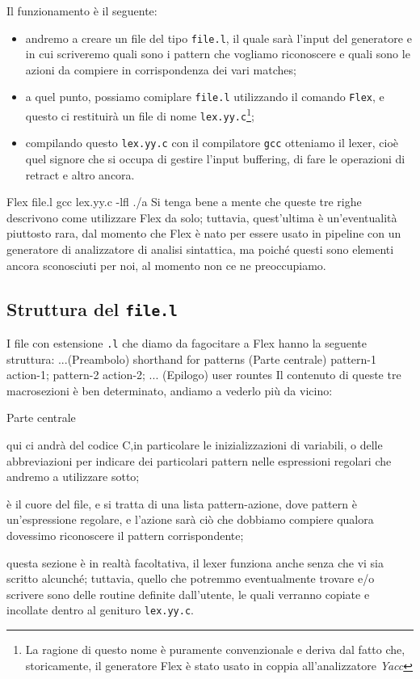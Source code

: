 \documentclass[class=book, crop=false, oneside, 12pt]{standalone}
\begin{document}
Il funzionamento è il seguente: 
\begin{itemize}
    \item andremo a creare un file del tipo \texttt{file.l}, il quale sarà l'input del generatore e in cui scriveremo quali sono i pattern che vogliamo riconoscere e quali sono le azioni da compiere in corrispondenza dei vari matches;
    \item a quel punto, possiamo comiplare \texttt{file.l} utilizzando il comando \texttt{Flex}, e questo ci restituirà un file di nome \texttt{lex.yy.c}\footnote{La ragione di questo nome è puramente convenzionale e deriva dal fatto che, storicamente, il generatore Flex è stato usato in coppia all'analizzatore \emph{Yacc}};
    \item compilando questo \texttt{lex.yy.c} con il compilatore \texttt{gcc} otteniamo il lexer, cioè quel signore che si occupa di gestire l'input buffering, di fare le operazioni di retract e altro ancora.
\end{itemize} 
Flex file.l
gcc lex.yy.c -lfl
./a
Si tenga bene a mente che queste tre righe descrivono come utilizzare Flex da solo; tuttavia, quest'ultima è un'eventualità piuttosto rara, dal momento che Flex è nato per essere usato in pipeline con un generatore di analizzatore di analisi sintattica, ma poiché questi sono elementi ancora sconosciuti per noi, al momento non ce ne preoccupiamo.

\subsection{Struttura del \texttt{file.l}}
I file con estensione \texttt{.l} che diamo da fagocitare a Flex hanno la seguente struttura:
...(Preambolo)
shorthand for patterns
(Parte centrale)
pattern-1 {action-1};
pattern-2 {action-2};
...
(Epilogo)
user rountes
Il contenuto di queste tre macrosezioni è ben determinato, andiamo a vederlo più da vicino:
\begin{labeling}{Parte centrale}
    \item[Preambolo] qui ci andrà del codice C,in particolare le inizializzazioni di variabili, o delle abbreviazioni per indicare dei particolari pattern nelle espressioni regolari che andremo a utilizzare sotto;
    \item[Parte centrale] è il cuore del file, e si tratta di una lista pattern-azione, dove pattern è un'espressione regolare, e l'azione sarà ciò che dobbiamo compiere qualora dovessimo riconoscere il pattern corrispondente;
    \item[Epilogo] questa sezione è in realtà facoltativa, il lexer funziona anche senza che vi sia scritto alcunché; tuttavia, quello che potremmo eventualmente trovare e/o scrivere sono delle routine definite dall'utente, le quali verranno copiate e incollate dentro al genituro \texttt{lex.yy.c}.
\end{labeling}
\end{document}

